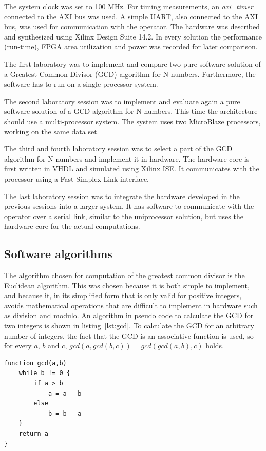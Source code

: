 \documentclass[11pt]{article}
\begin{document}
The system clock was set to 100 MHz. For timing measurements, an \emph{axi\_timer}\cite{axi-timer} connected to the AXI bus was used. A simple UART, also connected to the AXI bus, was used for communication with the operator. The hardware was described and synthesized using Xilinx Design Suite 14.2. In every solution the performance (run-time), FPGA area utilization and power was recorded for later comparison.

The first laboratory was to implement and compare two pure software solution of a Greatest Common Divisor (GCD) algorithm for N numbers. Furthermore, the software has to run on a single processor system.

The second laboratory session was to implement and evaluate again a pure software solution of a GCD algorithm for N numbers. This time the architecture should use a multi-processor system. The system uses two MicroBlaze processors, working on the same data set.

The third and fourth laboratory session was to select a part of the GCD algorithm for N numbers and implement it in hardware. The hardware core is first written in VHDL and simulated using Xilinx ISE. It communicates with the processor using a Fast Simplex Link interface\cite{fsl}.

The last laboratory session was to integrate the hardware developed in the previous sessions into a larger system. It has software to communicate with the operator over a serial link, similar to the uniprocessor solution, but uses the hardware core for the actual computations.

\subsection{Software algorithms}
The algorithm chosen for computation of the greatest common divisor is the Euclidean algorithm. This was chosen because it is both simple to implement, and because it, in its simplified form that is only valid for positive integers, avoids mathematical operations that are difficult to implement in hardware such as division and modulo. An algorithm in pseudo code to calculate the GCD for two integers\cite[pp. 318-320]{knuth} is shown in listing~\ref{lst:gcd}. To calculate the GCD for an arbitrary number of integers, the fact that the GCD is an associative function is used, so for every $a$, $b$ and $c$, $gcd(a, gcd(b, c)) = gcd(gcd(a, b), c)$ holds.

\begin{lstlisting}[float=tbh,frame=tb,captionpos=b,caption={Euclidean subtracion algorithm},label=lst:gcd]
function gcd(a,b)
	while b != 0 {
		if a > b
			a = a - b
		else
			b = b - a
	}
	return a
}
\end{lstlisting}
\end{document}

